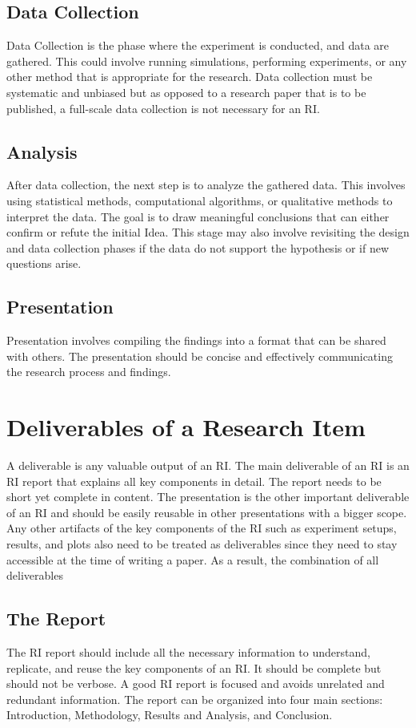 \documentclass{article}
\begin{document}
\subsection{Data Collection}
Data Collection is the phase where the experiment is conducted, and data are gathered. This could involve running simulations, performing experiments, or any other method that is appropriate for the research. Data collection must be systematic and unbiased but as opposed to a research paper that is to be published, a full-scale data collection is not necessary for an RI. 

\subsection{Analysis}
After data collection, the next step is to analyze the gathered data. This involves using statistical methods, computational algorithms, or qualitative methods to interpret the data. The goal is to draw meaningful conclusions that can either confirm or refute the initial Idea. This stage may also involve revisiting the design and data collection phases if the data do not support the hypothesis or if new questions arise.

\subsection{Presentation}
Presentation involves compiling the findings into a format that can be shared with others. The presentation should be concise and effectively communicating the research process and findings. 

\section{Deliverables of a Research Item}
A deliverable is any valuable output of an RI. The main deliverable of an RI is an RI report that explains all key components in detail. The report needs to be short yet complete in content. The presentation is the other important deliverable of an RI and should be easily reusable in other presentations with a bigger scope. Any other artifacts of the key components of the RI such as experiment setups, results, and plots also need to be treated as deliverables since they need to stay accessible at the time of writing a paper. As a result, the combination of all deliverables 

\subsection{The Report}
The RI report should include all the necessary information to understand, replicate, and reuse the key components of an RI. It should be complete but should not be verbose. A good RI report is focused and avoids unrelated and redundant information. The report can be organized into four main sections: Introduction, Methodology, Results and Analysis, and Conclusion. 
\end{document}
